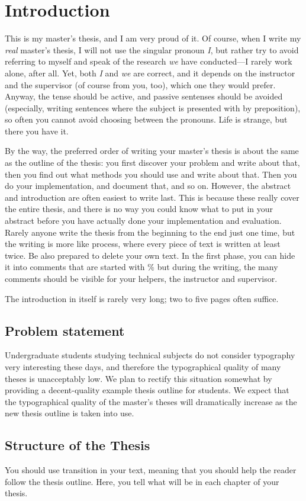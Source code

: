
\chapter{Introduction}
\label{chapter:intro}

This is my master's thesis, and I am very proud of it.  Of course,
when I write my \emph{real} master's thesis, I will not use the
singular pronoun \emph{I}, but rather try to avoid referring to myself
and speak of the research \emph{we} have conducted---I rarely work
alone, after all.  Yet, both \emph{I} and \emph{we} are correct, and
it depends on the instructor and the supervisor (of course from you,
too), which one they would prefer. Anyway, the tense should be active,
and passive sentenses should be avoided (especially, writing sentences
where the subject is presented with by preposition), so often you
cannot avoid choosing between the pronouns. Life is strange, but there
you have it.

By the way, the preferred order of writing your master's thesis is
about the same as the outline of the thesis: you first discover your
problem and write about that, then you find out what methods you
should use and write about that.  Then you do your implementation, and
document that, and so on.  However, the abstract and introduction are
often easiest to write last.  This is because these really cover the
entire thesis, and there is no way you could know what to put in your
abstract before you have actually done your implementation and
evaluation. Rarely anyone write the thesis from the beginning to the
end just one time, but the writing is more like process, where every
piece of text is written at least twice. Be also prepared to delete
your own text. In the first phase, you can hide it into comments that
are started with \% but during the writing, the many comments should be
visible for your helpers, the instructor and supervisor.

The introduction in itself is rarely very long; two to five pages often
suffice.


\section{Problem statement}

Undergraduate students studying technical subjects do not consider typography
very interesting these days, and therefore the typographical quality of many
theses is unacceptably low. 
We plan to rectify this situation somewhat by providing a decent-quality
example thesis outline for students.
We expect that the typographical quality of the master's theses will
dramatically increase as the new thesis outline is taken into use.

\section{Structure of the Thesis}
\label{section:structure} 

You should use transition in your text, meaning that you should help
the reader follow the thesis outline. Here, you tell what will be in
each chapter of your thesis. 


